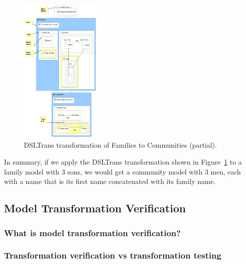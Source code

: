 \begin{figure}
\begin{center}
  \includegraphics[width=0.35\textwidth]{figures/families_to_persons_hot2}
  \caption{DSLTrans transformation of Families to Communities (partial).}
  \label{fig:families_mm}
\end{center}
\end{figure}

In summary, if we apply the DSLTrans transformation shown in  Figure~\ref{fig:families_mm} to a family model with 3 sons, we would get a community model with 3 men, each with a name that is its first name concatenated with its family name.


\subsection{Model Transformation Verification}

\subsubsection{What is model transformation verification?}

\subsubsection{Transformation verification vs transformation testing}











